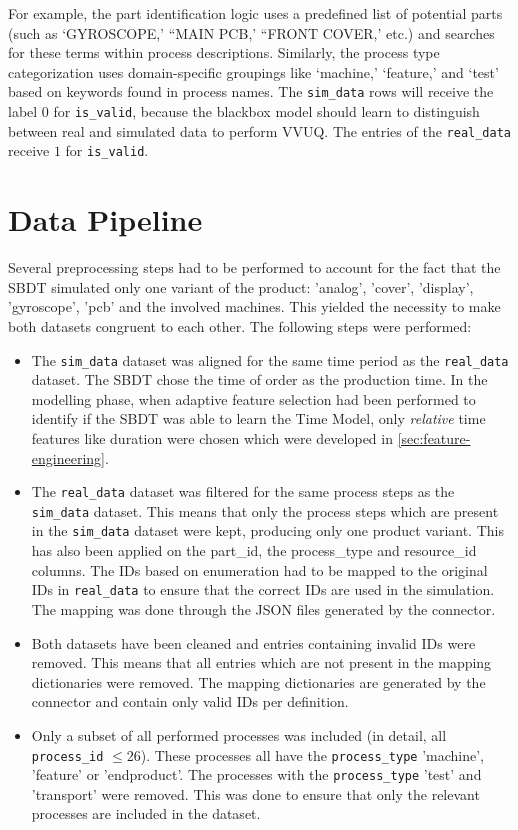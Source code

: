 For example, the part identification logic uses a predefined list of potential parts (such as `GYROSCOPE,' ``MAIN PCB,' ``FRONT COVER,' etc.) and searches for these terms within process descriptions. Similarly, the process type categorization uses domain-specific groupings like `machine,' `feature,' and `test' based on keywords found in process names. The \texttt{sim\_data} rows will receive the label $0$ for \texttt{is\_valid}, because the blackbox model should learn to distinguish between real and simulated data to perform VVUQ. The entries of the \texttt{real\_data} receive $1$ for \texttt{is\_valid}.


\section{Data Pipeline}
\label{sec:data-pipeline}

Several preprocessing steps had to be performed to account for the fact that the SBDT simulated only one variant of the product: 'analog', 'cover', 'display', 'gyroscope', 'pcb' and the involved machines. This yielded the necessity to make both datasets congruent to each other. The following steps were performed:

\begin{itemize}
  \item The \texttt{sim\_data} dataset was aligned for the same time period as the \texttt{real\_data} dataset. The SBDT chose the time of order as the production time. In the modelling phase, when adaptive feature selection had been performed to identify if the SBDT was able to learn the Time Model, only \textit{relative} time features like duration were chosen which were developed in \autoref{sec:feature-engineering}.
  \item The \texttt{real\_data} dataset was filtered for the same process steps as the \texttt{sim\_data} dataset. This means that only the process steps which are present in the \texttt{sim\_data} dataset were kept, producing only one product variant. This has also been applied on the part\_id, the process\_type and resource\_id columns. The IDs based on enumeration had to be mapped to the original IDs in \texttt{real\_data} to ensure that the correct IDs are used in the simulation. The mapping was done through the JSON files generated by the connector.
  \item Both datasets have been cleaned and entries containing invalid IDs were removed. This means that all entries which are not present in the mapping dictionaries were removed. The mapping dictionaries are generated by the connector and contain only valid IDs per definition.
  \item Only a subset of all performed processes was included (in detail, all \texttt{process\_id} $\le 26$). These processes all have the \texttt{process\_type} 'machine', 'feature' or 'endproduct'. The processes with the \texttt{process\_type} 'test' and 'transport' were removed. This was done to ensure that only the relevant processes are included in the dataset.
\end{itemize}

